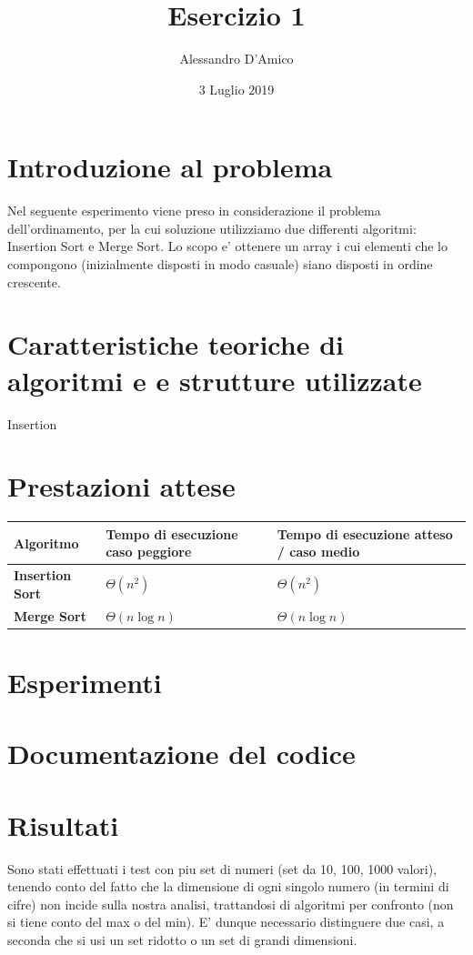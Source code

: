 \documentclass[a4paper]{article}
\title {{\TitleFont Esercizio 1}}
\date{3 Luglio 2019}
\author{{\AuthFont Alessandro D'Amico}}
\begin{document}
\begin{titlingpage}
\maketitle
\end{titlingpage}
\tableofcontents
\newpage
\section{Introduzione al problema}
Nel seguente esperimento viene preso in considerazione il problema dell'ordinamento, per la cui soluzione utilizziamo due differenti algoritmi: Insertion Sort e Merge Sort.
Lo scopo e' ottenere un array i cui elementi che lo compongono (inizialmente disposti in modo casuale) siano disposti in ordine crescente.
\section{Caratteristiche teoriche di algoritmi e e strutture utilizzate}
Insertion
\section{Prestazioni attese}
	\begin{tabularx}{10cm}{|X|X|X|}
	\hline
	Algoritmo & Tempo di esecuzione caso peggiore & Tempo di esecuzione atteso / caso medio \\
	\hline
	\textbf{Insertion Sort} & $\Theta(n^2)$  & $\Theta(n^2)$ \\
	\hline
	\textbf{Merge Sort} &  $\Theta(n\log{}n)$ & $\Theta(n\log{}n)$\\
	\hline
	\end{tabularx}
\section{Esperimenti}
\section{Documentazione del codice}
\newpage
\section{Risultati}
Sono stati effettuati i test con piu set di numeri (set da 10, 100, 1000 valori), tenendo conto del fatto che la dimensione di ogni singolo numero (in termini di cifre) non incide sulla nostra analisi, trattandosi di algoritmi per confronto (non si tiene conto del max o del min). E' dunque necessario distinguere due casi, a seconda che si usi un set ridotto o un set di grandi dimensioni. 
\end{document}
